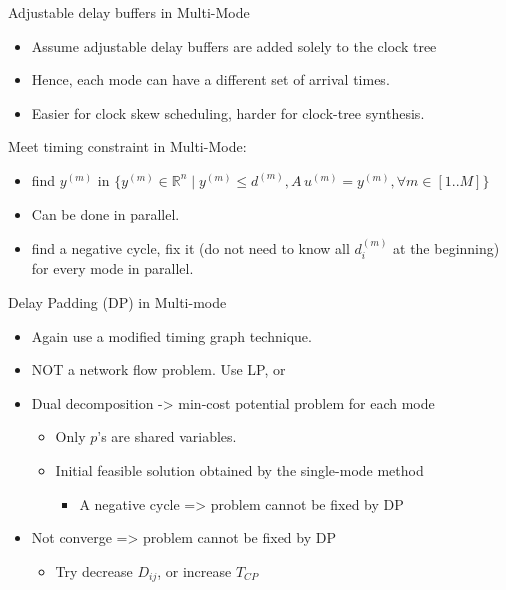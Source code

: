 \documentclass[10pt,ignorenonframetext,mathserif]{beamer}
\providecommand{\tightlist}{%
  \setlength{\itemsep}{0pt}\setlength{\parskip}{0pt}}
\begin{document}
\begin{frame}{Adjustable delay buffers in Multi-Mode}

\begin{itemize}
\tightlist
\item
  Assume adjustable delay buffers are added solely to the clock tree
\item
  Hence, each mode can have a different set of arrival times.
\item
  Easier for clock skew scheduling, harder for clock-tree synthesis.
\end{itemize}

\end{frame}

\begin{frame}{Meet timing constraint in Multi-Mode:}

\begin{itemize}
\tightlist
\item
  find \(y^{(m)}\) in
  \(\{y^{(m)} \in \mathbb{R}^n \mid y^{(m)} \leq d^{(m)}, A\,u^{(m)} = y^{(m)}, \forall m\in[1..M]\}\)
\item
  Can be done in parallel.
\item
  find a negative cycle, fix it (do not need to know all \(d_i^{(m)}\)
  at the beginning) for every mode in parallel.
\end{itemize}

\end{frame}

\begin{frame}{Delay Padding (DP) in Multi-mode}

\begin{itemize}
\tightlist
\item
  Again use a modified timing graph technique.
\item
  NOT a network flow problem. Use LP, or
\item
  Dual decomposition -\textgreater{} min-cost potential problem for each
  mode

  \begin{itemize}
  \tightlist
  \item
    Only \(p\)'s are shared variables.
  \item
    Initial feasible solution obtained by the single-mode method

    \begin{itemize}
    \tightlist
    \item
      A negative cycle =\textgreater{} problem cannot be fixed by DP
    \end{itemize}
  \end{itemize}
\item
  Not converge =\textgreater{} problem cannot be fixed by DP

  \begin{itemize}
  \tightlist
  \item
    Try decrease \(D_{ij}\), or increase \(T_{CP}\)
  \end{itemize}
\end{itemize}

\end{frame}
\end{document}
